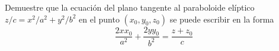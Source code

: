 \item Demuestre que la ecuación del plano tangente al paraboloide elíptico $z/c = x^2/a^2 + y^2/b^2$ en el punto $(x_0, y_0, z_0)$ se puede escribir en la forma
\[ \frac{2xx_0}{a^2} + \frac{2yy_0}{b^2} = \frac{z + z_0}{c} \]
